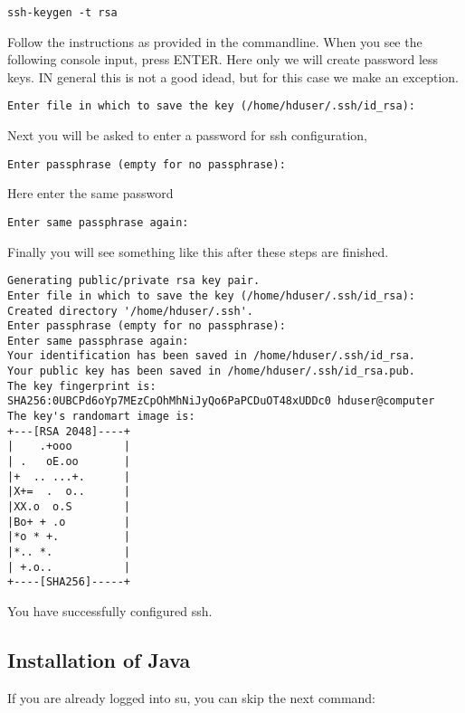 \begin{lstlisting}
ssh-keygen -t rsa
\end{lstlisting}

Follow the instructions as provided in the commandline.
When you see the following console input, press ENTER. Here only we
will create password less keys. IN general this is not a good idead,
but for this case we make an exception.

\begin{lstlisting}
Enter file in which to save the key (/home/hduser/.ssh/id_rsa):
\end{lstlisting}

Next you will be asked to enter a password for ssh configuration,

\begin{lstlisting}
Enter passphrase (empty for no passphrase):
\end{lstlisting}

Here enter the same password

\begin{lstlisting}
Enter same passphrase again:
\end{lstlisting}

Finally you will see something like this after these steps are finished.

\begin{lstlisting}
Generating public/private rsa key pair.
Enter file in which to save the key (/home/hduser/.ssh/id_rsa):
Created directory '/home/hduser/.ssh'.
Enter passphrase (empty for no passphrase):
Enter same passphrase again:
Your identification has been saved in /home/hduser/.ssh/id_rsa.
Your public key has been saved in /home/hduser/.ssh/id_rsa.pub.
The key fingerprint is:
SHA256:0UBCPd6oYp7MEzCpOhMhNiJyQo6PaPCDuOT48xUDDc0 hduser@computer
The key's randomart image is:
+---[RSA 2048]----+
|    .+ooo        |
| .   oE.oo       |
|+  .. ...+.      |
|X+=  .  o..      |
|XX.o  o.S        |
|Bo+ + .o         |
|*o * +.          |
|*.. *.           |
| +.o..           |
+----[SHA256]-----+
\end{lstlisting}

You have successfully configured ssh.

\subsection{Installation of Java}

If you are already logged into su, you can skip the next command:

